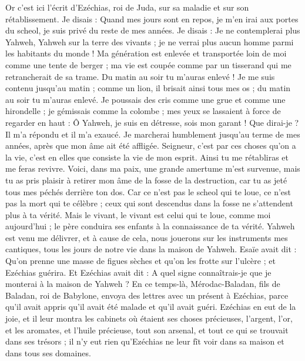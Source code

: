 \begin{multicols}{2}
Or c'est ici l'écrit d'Ezéchias, roi de Juda, sur sa maladie et sur son rétablissement.
Je disais : Quand mes jours sont en repos, je m'en irai aux portes du scheol, je suis privé du reste de mes années.
Je disais : Je ne contemplerai plus Yahweh, Yahweh sur la terre des vivants ; je ne verrai plus aucun homme parmi les habitants du monde !
Ma génération est enlevée et transportée loin de moi comme une tente de berger ; ma vie est coupée comme par un tisserand qui me retrancherait de sa trame. Du matin au soir tu m'auras enlevé !
Je me suis contenu jusqu'au matin ; comme un lion, il brisait ainsi tous mes os ; du matin au soir tu m'auras enlevé.
Je poussais des cris comme une grue et comme une hirondelle ; je gémissais comme la colombe ; mes yeux se lassaient à force de regarder en haut : Ô Yahweh, je suis en détresse, sois mon garant !
Que dirai-je ? Il m'a répondu et il m'a exaucé. Je marcherai humblement jusqu'au terme de mes années, après que mon âme ait été affligée.
Seigneur, c'est par ces choses qu'on a la vie, c'est en elles que consiste la vie de mon esprit. Ainsi tu me rétabliras et me feras revivre.
Voici, dans ma paix, une grande amertume m'est survenue, mais tu as pris plaisir à retirer mon âme de la fosse de la destruction, car tu as jeté tous mes péchés derrière ton dos.
Car ce n'est pas le scheol qui te loue, ce n'est pas la mort qui te célèbre ; ceux qui sont descendus dans la fosse ne s'attendent plus à ta vérité.
Mais le vivant, le vivant est celui qui te loue, comme moi aujourd'hui ; le père conduira ses enfants à la connaissance de ta vérité.
Yahweh est venu me délivrer, et à cause de cela, nous jouerons sur les instruments mes cantiques, tous les jours de notre vie dans la maison de Yahweh.
Esaïe avait dit : Qu'on prenne une masse de figues sèches et qu'on les frotte sur l'ulcère ; et Ezéchias guérira.
Et Ezéchias avait dit : A quel signe connaîtrais-je que je monterai à la maison de Yahweh ?
\VerseOne{}En ce temps-là, Mérodac-Baladan, fils de Baladan, roi de Babylone, envoya des lettres avec un présent à Ezéchias, parce qu'il avait appris qu'il avait été malade et qu'il avait guéri.
Ezéchias en eut de la joie, et il leur montra les cabinets où étaient ses choses précieuses, l'argent, l'or, et les aromates, et l'huile précieuse, tout son arsenal, et tout ce qui se trouvait dans ses trésors ; il n'y eut rien qu'Ezéchias ne leur fît voir dans sa maison et dans tous ses domaines.

\end{multicols}
